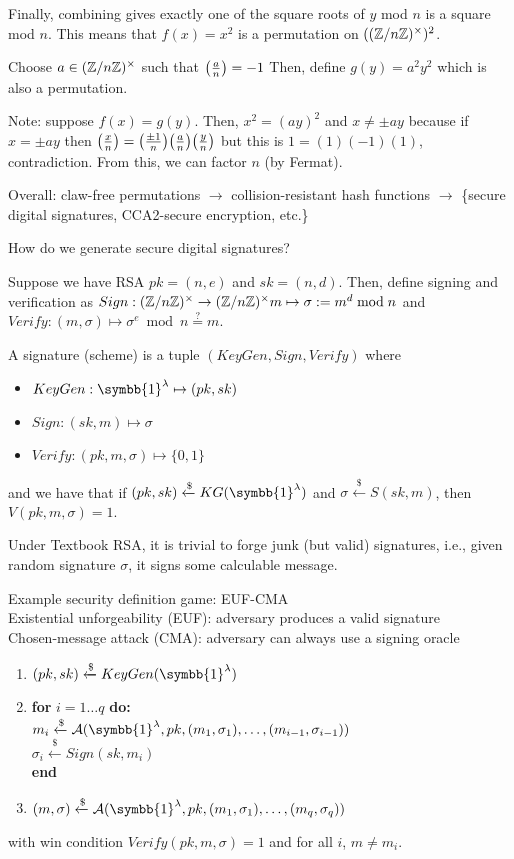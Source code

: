\documentclass[notes]{agony}
\newcommand{\xgets}{\xleftarrow}
\newcommand{\one}{\symbb{1}}
\newcommand{\leg}[2]{\qty(\frac{#1}{#2})}
\newcommand{\mgrp}[1]{(\Z/#1\Z)^\times}
\begin{document}
Finally, combining gives exactly one of the square roots of $y$ mod $n$
is a square mod $n$.
This means that $f(x) = x^2$ is a permutation on $(\mgrp n)^2$.

Choose $a \in \mgrp n$ such that $\leg{a}{n}=-1$
Then, define $g(y) = a^2 y^2$ which is also a permutation.

Note: suppose $f(x) = g(y)$.
Then, $x^2 = (ay)^2$ and $x \neq \pm ay$
because if $x = \pm ay$ then $\leg{x}{n} = \leg{\pm 1}{n}\leg{a}{n}\leg{y}{n}$
but this is $1 = (1)(-1)(1)$, contradiction.
From this, we can factor $n$ (by Fermat).

Overall: claw-free permutations $\to$ collision-resistant hash functions
$\to$ \{secure digital signatures, CCA2-secure encryption, etc.\}

How do we generate secure digital signatures?

Suppose we have RSA $pk = (n,e)$ and $sk = (n,d)$.
Then, define signing and verification as
$Sign : \mgrp{n} \to \mgrp{n} m \mapsto \sigma := m^d \bmod n$
and $Verify : (m,\sigma) \mapsto \sigma^e \bmod n \stackrel{?}{=} m$.

\begin{defn}
  A signature (scheme) is a tuple $(KeyGen, Sign, Verify)$ where
  \begin{itemize}[nosep]
    \item $KeyGen : \one^\lambda \mapsto (pk, sk)$
    \item $Sign : (sk, m) \mapsto \sigma$
    \item $Verify : (pk, m, \sigma) \mapsto \{0,1\}$
  \end{itemize}
  and we have that if $(pk, sk) \xgets{\$} KG(\one^\lambda)$
  and $\sigma \xgets{\$} S(sk,m)$, then $V(pk, m, \sigma) = 1$.
\end{defn}

Under Textbook RSA, it is trivial to forge junk (but valid) signatures,
i.e., given random signature $\sigma$, it signs some calculable message.

Example security definition game: EUF-CMA \\
Existential unforgeability (EUF): adversary produces a valid signature \\
Chosen-message attack (CMA): adversary can always use a signing oracle
\begin{enumerate}[1., nosep]
  \item $(pk, sk) \xgets{\$} KeyGen(\one^\lambda)$
  \item \textbf{for} $i=1\dots q$ \textbf{do:} \\
        \hspace*{1cm} $m_i \xgets{\$} \mathcal A(\one^\lambda, pk, (m_1,\sigma_1),\dotsc,(m_{i-1},\sigma_{i-1}))$ \\
        \hspace*{1cm} $\sigma_i \xgets{\$} Sign(sk, m_i)$ \\
        \textbf{end}
  \item $(m,\sigma) \xgets{\$} \mathcal A(\one^\lambda, pk, (m_1,\sigma_1),\dotsc,(m_q,\sigma_q))$
\end{enumerate}
with win condition $Verify(pk,m,\sigma)=1$ and for all $i$, $m \neq m_i$.
\end{document}
